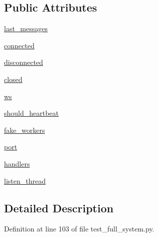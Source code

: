 \subsection*{Public Attributes}
\begin{DoxyCompactItemize}
\item 
\hyperlink{classparlai_1_1mturk_1_1core_1_1legacy__2018_1_1test_1_1test__full__system_1_1MockSocket_a24e7588b1330ebe50423cdfed7f11374}{last\+\_\+messages}
\item 
\hyperlink{classparlai_1_1mturk_1_1core_1_1legacy__2018_1_1test_1_1test__full__system_1_1MockSocket_a5e2362f162ac68cbc8ef7e6c8c356c23}{connected}
\item 
\hyperlink{classparlai_1_1mturk_1_1core_1_1legacy__2018_1_1test_1_1test__full__system_1_1MockSocket_a71c8013d07129adaf161734fcd0f7d63}{disconnected}
\item 
\hyperlink{classparlai_1_1mturk_1_1core_1_1legacy__2018_1_1test_1_1test__full__system_1_1MockSocket_a1f98802a97d72a1fcddcbbcdab42e6dc}{closed}
\item 
\hyperlink{classparlai_1_1mturk_1_1core_1_1legacy__2018_1_1test_1_1test__full__system_1_1MockSocket_a4880b2d86e4a803c00b8a3b1b9b83eeb}{ws}
\item 
\hyperlink{classparlai_1_1mturk_1_1core_1_1legacy__2018_1_1test_1_1test__full__system_1_1MockSocket_a390a8d5ddb5ab5e78079a83bf16c88d7}{should\+\_\+heartbeat}
\item 
\hyperlink{classparlai_1_1mturk_1_1core_1_1legacy__2018_1_1test_1_1test__full__system_1_1MockSocket_a9f9ba0003113026f7bd4e0cc4d6c3b24}{fake\+\_\+workers}
\item 
\hyperlink{classparlai_1_1mturk_1_1core_1_1legacy__2018_1_1test_1_1test__full__system_1_1MockSocket_a89cd4136510a4128b6307982f97103b1}{port}
\item 
\hyperlink{classparlai_1_1mturk_1_1core_1_1legacy__2018_1_1test_1_1test__full__system_1_1MockSocket_a531df078fba32032d5bbc2aa913b5ee9}{handlers}
\item 
\hyperlink{classparlai_1_1mturk_1_1core_1_1legacy__2018_1_1test_1_1test__full__system_1_1MockSocket_a98bef1be4e0a793cc81bd1f378e39eda}{listen\+\_\+thread}
\end{DoxyCompactItemize}


\subsection{Detailed Description}


Definition at line 103 of file test\+\_\+full\+\_\+system.\+py.



